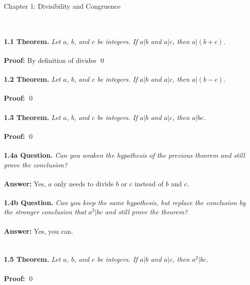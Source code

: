 \documentclass[12pt]{article}
\begin{document}
\thispagestyle{empty}
\pagestyle{empty}

\begin{center}
    Chapter 1: Divisibility and Congruence
\end{center}
~\\
~\\
\noindent \textbf{1.1 Theorem.} 
\emph{Let  $a$, $b$, and $c$ be integers. 
If $a \vert b$ and $a \vert c$, then $a \vert (b+c)$.}
~\\
~\\
\textbf{Proof:}  
By definition of divides \qed
~\\
~\\


\noindent \textbf{1.2 Theorem.} 
\emph{Let  $a$, $b$, and $c$ be integers. 
If $a \vert b$ and $a \vert c$, then $a \vert (b-c)$.}
~\\
~\\
\textbf{Proof:}  \qed
~\\
~\\

\noindent \textbf{1.3 Theorem.}
\emph{Let $a$, $b$, and $c$ be integers. If $a \vert b$ and $a \vert c$, 
then $a \vert bc$.}
~\\
~\\
\textbf{Proof:}
 \qed
~\\
~\\

\noindent \textbf{1.4a Question.} 
\emph{Can you weaken the hypothesis of the previous theorem and
still prove the conclusion? }
~\\
~\\
\textbf{Answer:} Yes, $a$ only needs to divide $b$ or $c$ instead of 
$b$ and $c$. 
~\\
~\\
\textbf{1.4b Question.}
\emph{Can you keep the same hypothesis, but replace
the conclusion by the stronger conclusion that $a^2 \vert bc$ and still prove the
theorem?}
~\\
~\\
\textbf{Answer:} Yes, you can. 
~\\
~\\

\newpage
~\\

\noindent \textbf{1.5 Theorem.} 
\emph{Let $a$, $b$, and $c$ be integers. If $a \vert b$ and $a \vert c$, 
then $a^2 \vert bc$.}
~\\
~\\
\textbf{Proof:}
\qed
~\\
~\\
\end{document}
